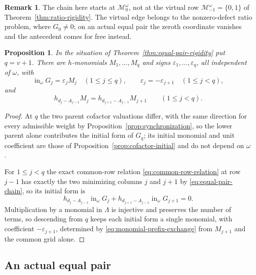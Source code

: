 \documentclass[11pt,a4paper]{amsart}
\numberwithin{equation}{section}
\theoremstyle{plain}
\newtheorem{proposition}[theorem]{Proposition}
\theoremstyle{definition}
\newtheorem{remark}[theorem]{Remark}
\newcommand{\Lam}{\Lambda}
\newcommand{\inin}{\operatorname{in}}
\begin{document}
\begin{remark}\label{rem:no-virtual-row}
The chain here starts at \(\mathcal M_0^\omega\), not at the virtual row \(\mathcal M_{-1}^\omega=\{0,1\}\) of Theorem~\ref{thm:ratio-rigidity}.  The virtual edge belongs to the nonzero-defect ratio problem, where \(G_0\ne0\); on an actual equal pair the zeroth coordinate vanishes and the antecedent comes for free instead.
\end{remark}

\begin{proposition}\label{prop:monomial-prefix}
In the situation of Theorem~\ref{thm:equal-pair-rigidity} put \(q=v+1\).  There are \(h\)-monomials \(M_1,\ldots,M_q\) and signs \(\varepsilon_1,\ldots,\varepsilon_q\), all independent of \(\omega\), with
\[
\inin_\omega G_j=\varepsilon_jM_j
\quad(1\le j\le q),
\qquad
\varepsilon_j=-\varepsilon_{j+1}
\quad(1\le j<q),
\]
and
\begin{equation}\label{eq:monomial-prefix-exchange}
h_{d_j-A_{j-1}}M_j
=
h_{d_{j+1}-A_{j-1}}M_{j+1}
\qquad(1\le j<q).
\end{equation}
\end{proposition}

\begin{proof}
At \(q\) the two parent cofactor valuations differ, with the same direction for every admissible weight by Proposition~\ref{prop:synchronization}, so the lower parent alone contributes the initial form of \(G_q\); its initial monomial and unit coefficient are those of Proposition~\ref{prop:cofactor-initial} and do not depend on \(\omega\).

For \(1\le j<q\) the exact common-row relation \eqref{eq:common-row-relation} at row \(j-1\) has exactly the two minimizing columns \(j\) and \(j+1\) by \eqref{eq:equal-pair-chain}, so its initial form is
\[
h_{d_j-A_{j-1}}\inin_\omega G_j
+
h_{d_{j+1}-A_{j-1}}\inin_\omega G_{j+1}
=0.
\]
Multiplication by a monomial in \(\Lam\) is injective and preserves the number of terms, so descending from \(q\) keeps each initial form a single monomial, with coefficient \(-\varepsilon_{j+1}\), determined by \eqref{eq:monomial-prefix-exchange} from \(M_{j+1}\) and the common grid alone.
\end{proof}

\subsection{An actual equal pair}\label{subsec:equal-example}
\end{document}
